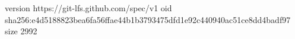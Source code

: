 version https://git-lfs.github.com/spec/v1
oid sha256:e4d5188823bea6fa56ffae44b1b3793475dfd1e92c440940ac51ce8dd4badf97
size 2992
